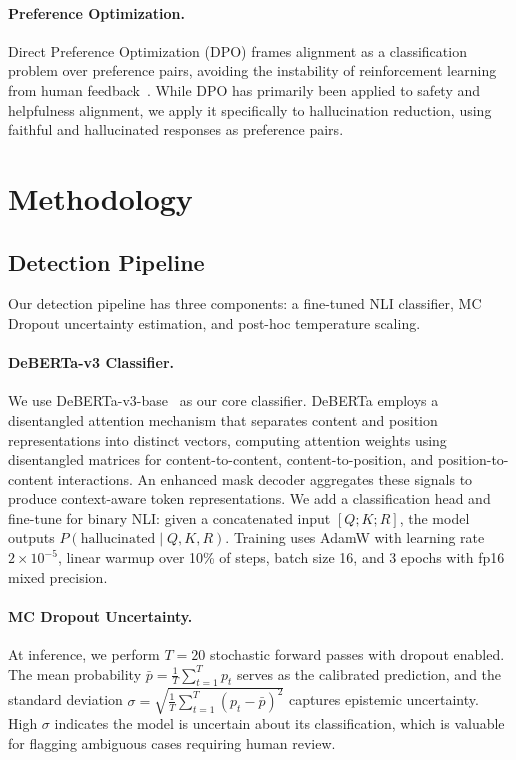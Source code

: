 \documentclass[11pt]{article}
\begin{document}
\paragraph{Preference Optimization.} Direct Preference Optimization (DPO) frames alignment as a classification problem over preference pairs, avoiding the instability of reinforcement learning from human feedback~\citep{rafailov2023direct}. While DPO has primarily been applied to safety and helpfulness alignment, we apply it specifically to hallucination reduction, using faithful and hallucinated responses as preference pairs.


\section{Methodology}

\subsection{Detection Pipeline}

Our detection pipeline has three components: a fine-tuned NLI classifier, MC Dropout uncertainty estimation, and post-hoc temperature scaling.

\paragraph{DeBERTa-v3 Classifier.} We use DeBERTa-v3-base~\citep{he2023debertav3} as our core classifier. DeBERTa employs a disentangled attention mechanism that separates content and position representations into distinct vectors, computing attention weights using disentangled matrices for content-to-content, content-to-position, and position-to-content interactions. An enhanced mask decoder aggregates these signals to produce context-aware token representations. We add a classification head and fine-tune for binary NLI: given a concatenated input $[Q; K; R]$, the model outputs $P(\text{hallucinated} \mid Q, K, R)$. Training uses AdamW with learning rate $2 \times 10^{-5}$, linear warmup over 10\% of steps, batch size 16, and 3 epochs with fp16 mixed precision.

\paragraph{MC Dropout Uncertainty.} At inference, we perform $T=20$ stochastic forward passes with dropout enabled. The mean probability $\bar{p} = \frac{1}{T}\sum_{t=1}^{T} p_t$ serves as the calibrated prediction, and the standard deviation $\sigma = \sqrt{\frac{1}{T}\sum_{t=1}^{T}(p_t - \bar{p})^2}$ captures epistemic uncertainty. High $\sigma$ indicates the model is uncertain about its classification, which is valuable for flagging ambiguous cases requiring human review.
\end{document}
